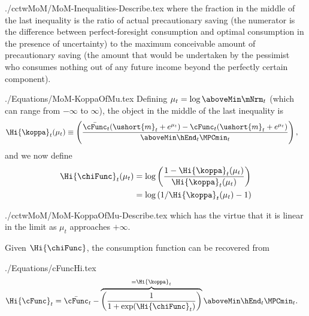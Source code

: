 \documentclass[titlepage, headings=optiontotocandhead]{\econtex}
\begin{document}
\unskip
\begin{verbatimwrite}{./cctwMoM/MoM-Inequalities-Describe.tex}
  where the fraction in the middle of the last inequality is the ratio
  of actual precautionary saving (the numerator is the difference
  between perfect-foresight consumption and optimal consumption in the
  presence of uncertainty) to the maximum conceivable amount of
  precautionary saving (the amount that would be undertaken by the
  pessimist who consumes nothing out of any future income beyond the perfectly certain component).
\end{verbatimwrite}
\unskip

\begin{verbatimwrite}{./Equations/MoM-KoppaOfMu.tex}
  Defining $\mu_{t} =
  \log \aboveMin \mNrm_{t}$ (which can range from $-\infty$ to $\infty$), the object in the middle of the last inequality is
  \begin{equation}\begin{gathered}\begin{aligned}
        \Hi{\koppa}_{t}(\mu_{t})   & \equiv  \left(\frac{\bar{\cFunc}_{t}(\ushort{m}_{t}+e^{\mu_{t}})-\cFunc_{t}(\ushort{m}_{t}+e^{\mu_{t}})}{\aboveMin \hEnd_{t} \MPCmin_{t}}\right), \label{eq:koppa}
      \end{aligned}\end{gathered}\end{equation}
  and we now define
  \begin{equation}\begin{gathered}\begin{aligned}
        \Hi{\chiFunc}_{t}(\mu_{t})  & = \log \left(\frac{1-\Hi{\koppa}_{t}(\mu_{t})}{\Hi{\koppa}_{t}(\mu_{t})}\right)
        \\  & = \log \left(1/\Hi{\koppa}_{t}(\mu_{t})-1\right) \label{eq:chi}
      \end{aligned}\end{gathered}\end{equation}
\end{verbatimwrite}
\unskip
\begin{verbatimwrite}{./cctwMoM/MoM-KoppaOfMu-Describe.tex}
  which has the virtue that it is linear in the limit as $\mu_{t}$ approaches $+\infty$.

  Given $\Hi{\chiFunc}$, the consumption function can be recovered from
\end{verbatimwrite}

\begin{verbatimwrite}{./Equations/cFuncHi.tex}
  \begin{equation}\begin{gathered}\begin{aligned}
        \Hi{\cFunc}_{t}  & = \bar{\cFunc}_{t}-\overbrace{\left(\frac{1}{1+\exp(\Hi{\chiFunc}_{t})}\right)}^{=\Hi{\koppa}_{t}} \aboveMin \hEnd_{t} \MPCmin_{t}. \label{eq:cFuncHi}
      \end{aligned}\end{gathered}\end{equation}
\end{verbatimwrite}
\unskip
\end{document}
